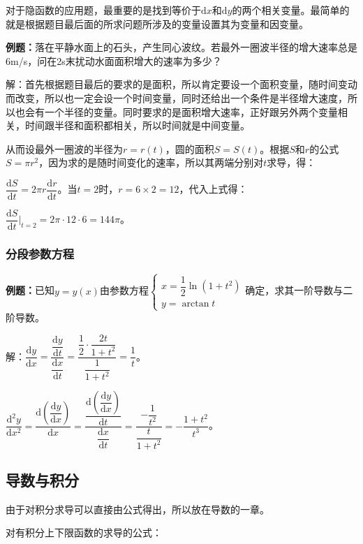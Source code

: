 \documentclass[UTF8, 12pt]{ctexart}
\begin{document}
对于隐函数的应用题，最重要的是找到等价于$\textrm{d}x$和$\textrm{d}y$的两个相关变量。最简单的就是根据题目最后面的所求问题所涉及的变量设置其为变量和因变量。

\textbf{例题：}落在平静水面上的石头，产生同心波纹。若最外一圈波半径的增大速率总是6m/s，问在2s末扰动水面面积增大的速率为多少？

解：首先根据题目最后的要求的是面积，所以肯定要设一个面积变量，随时间变动而改变，所以也一定会设一个时间变量，同时还给出一个条件是半径增大速度，所以也会有一个半径的变量。同时要求的是面积增大速率，正好跟另外两个变量相关，时间跟半径和面积都相关，所以时间就是中间变量。

从而设最外一圈波的半径为$r=r(t)$，圆的面积$S=S(t)$。根据$S$和$r$的公式$S=\pi r^2$，因为求的是随时间变化的速率，所以其两端分别对$t$求导，得：

$\dfrac{\textrm{d}S}{\textrm{d}t}=2\pi r\dfrac{\textrm{d}r}{\textrm{d}t}$。当$t=2$时，$r=6\times2=12$，代入上式得：\medskip

$\dfrac{\textrm{d}S}{\textrm{d}t}\bigg|_{t=2}=2\pi\cdot12\cdot6=144\pi$。

\subsubsection{分段参数方程}

\textbf{例题：}已知$y=y(x)$由参数方程$\left\{\begin{array}{lcl}
    x=\dfrac{1}{2}\ln(1+t^2) \\
    y=\arctan t
\end{array}
\right.$确定，求其一阶导数与二阶导数。

解：$\dfrac{\textrm{d}y}{\textrm{d}x}=\dfrac{\dfrac{\textrm{d}y}{\textrm{d}t}}{\dfrac{\textrm{d}x}{\textrm{d}t}}=\dfrac{\dfrac{1}{2}\cdot\dfrac{2t}{1+t^2}}{\dfrac{1}{1+t^2}}=\dfrac{1}{t}$。

$\dfrac{\textrm{d}^2y}{\textrm{d}x^2}=\dfrac{\textrm{d}\left(\dfrac{\textrm{d}y}{\textrm{d}x}\right)}{\textrm{d}x}=\dfrac{\dfrac{\textrm{d}\left(\dfrac{\textrm{d}y}{\textrm{d}x}\right)}{\textrm{d}t}}{\dfrac{\textrm{d}x}{\textrm{d}t}}=\dfrac{-\dfrac{1}{t^2}}{\dfrac{t}{1+t^2}}=-\dfrac{1+t^2}{t^3}$。

\subsection{导数与积分}

由于对积分求导可以直接由公式得出，所以放在导数的一章。

对有积分上下限函数的求导的公式：
\end{document}
